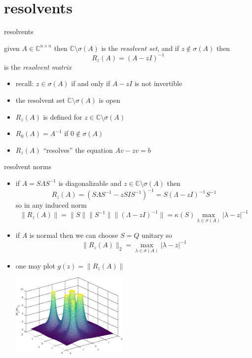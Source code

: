 \documentclass[10pt,hyperref]{beamer}
\newcommand{\CC}{\mathbb{C}}
\begin{document}
\section{resolvents}

\begin{frame}{resolvents}

\begin{definition}
given $A\in\CC^{n\times n}$ then $\CC\setminus \sigma(A)$ is the \emph{resolvent set}, and if $z \notin \sigma(A)$ then
    $$R_z(A) = \left(A-z I\right)^{-1}$$
is the \emph{resolvent matrix}
\end{definition}

\begin{itemize}
\item recall: $z \in \sigma(A)$ if and only if $A-z I$ is not invertible
\item the resolvent set $\CC\setminus \sigma(A)$ is open
\item $R_z(A)$ is defined for $z \in \CC\setminus \sigma(A)$
\item $R_0(A)=A^{-1}$ if $0\notin\sigma(A)$
\item $R_z(A)$ ``resolves'' the equation $Av-z v=b$
\end{itemize}
\end{frame}


\begin{frame}{resolvent norms}

\begin{itemize}
\item if $A=S\Lambda S^{-1}$ is diagonalizable and $z\in \CC\setminus \sigma(A)$ then
    $$R_z(A) = \left(S\Lambda S^{-1}-z S I S^{-1}\right)^{-1} = S \left(\Lambda - z I\right)^{-1} S^{-1}$$
so in any induced norm
    $$\|R_z(A)\| = \|S\|\|S^{-1}\|\|\left(\Lambda - z I\right)^{-1}\| = \kappa(S) \max_{\lambda\in\sigma(A)} |\lambda-z|^{-1}$$
\item if $A$ is normal then we can choose $S=Q$ unitary so
    $$\|R_z(A)\|_2 = \max_{\lambda\in\sigma(A)} |\lambda-z|^{-1}$$
\item one may plot $g(z)=\|R_z(A)\|$

\vspace{-5mm}
\hfill \includegraphics[width=0.45\textwidth]{figs/resolvesurf}
\end{itemize}
\end{frame}
\end{document}
